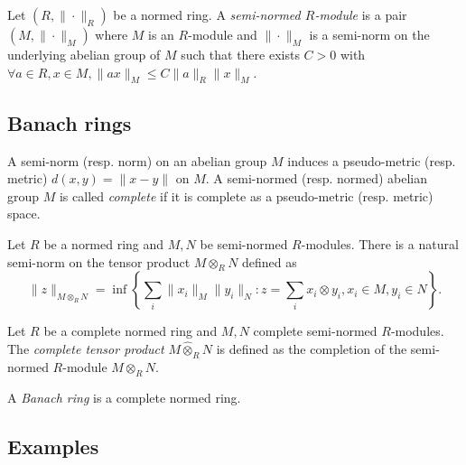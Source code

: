     \begin{definition}\label{def:semi-normed_modules}
        Let \((R, \|\cdot\|_R)\) be a normed ring.
        A \emph{semi-normed \(R\)-module} is a pair \((M, \|\cdot\|_M)\) where \(M\) is an \(R\)-module and \(\|\cdot\|_M\) is a semi-norm on the underlying abelian group of \(M\) such that there exists \(C > 0\) with \(\forall a \in R, x \in M, \|ax\|_M \leq C \|a\|_R \|x\|_M\).
    \end{definition}




\subsection{Banach rings}

    \begin{definition}\label{def:complete_semi-normed_abelian_group}
        A semi-norm (resp. norm) on an abelian group \(M\) induces a pseudo-metric (resp. metric) \(d(x,y) = \|x - y\|\) on \(M\).
        A semi-normed (resp. normed) abelian group \(M\) is called \emph{complete} if it is complete as a pseudo-metric (resp. metric) space.
    \end{definition}

    Let \(R\) be a normed ring and \(M,N\) be semi-normed \(R\)-modules.
    There is a natural semi-norm on the tensor product \(M \otimes_R N\) defined as
    \[
        \|z\|_{M \otimes_R N} = \inf \left\{ \sum_{i} \|x_i\|_M \|y_i\|_N : z = \sum_i x_i \otimes y_i, x_i \in M, y_i \in N \right\}.
    \]

    \begin{definition}\label{def:complete_tensor_product}
        Let \(R\) be a complete normed ring and \(M,N\) complete semi-normed \(R\)-modules.
        The \emph{complete tensor product} \(M \widehat{\otimes}_R N\) is defined as the completion of the semi-normed \(R\)-module \(M \otimes_R N\).
    \end{definition}

    \begin{definition}\label{def:banach_ring}
        A \emph{Banach ring} is a complete normed ring.
    \end{definition}



\subsection{Examples}

